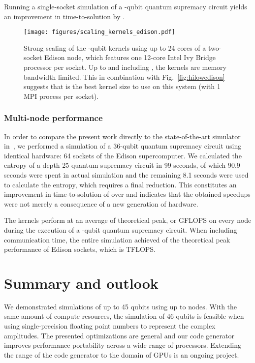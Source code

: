 \documentclass[sigconf]{acmart}
\begin{document}
Running a single-socket simulation of a -qubit quantum supre\-macy circuit yields an improvement in time-to-solution by .

\begin{figure}[t]
	\texttt{[image: figures/scaling\_kernels\_edison.pdf]}
	\caption{Strong scaling of the -qubit kernels using up to 24 cores of a two-socket Edison node, which features one 12-core Intel\textregistered{} Ivy Bridge\texttrademark{} processor per socket. Up to and including , the kernels are memory bandwidth limited. This in combination with Fig.~\ref{fig:hilowedison} suggests that  is the best kernel size to use on this system (with 1 MPI process per socket).}
	\label{fig:strongnodescalingedison}
\end{figure}

\subsubsection{Multi-node performance}

In order to compare the present work directly to the state-of-the-art simulator in~\cite{boixo2016characterizing}, we performed a simulation of a 36-qubit quantum supremacy circuit using identical hardware: 64 sockets of the Edison supercomputer. We calculated the entropy of a depth-25 quantum supremacy circuit in 99 seconds, of which 90.9 seconds were spent in actual simulation and the remaining 8.1 seconds were used to calculate the entropy, which requires a final reduction. This constitutes an improvement in time-to-solution of over  and indicates that the obtained speedups were not merely a consequence of a new generation of hardware.

The kernels perform at an average of  theoretical peak, or  GFLOPS on every node during the execution of a -qubit quantum supremacy circuit. When including communication time, the entire simulation achieved  of the theoretical peak performance of  Edison sockets, which is  TFLOPS.

\section{Summary and outlook}
We demonstrated simulations of up to 45 qubits using up to  nodes. With the same amount of compute resources, the simulation of 46 qubits is feasible when using single-precision floating point numbers to represent the complex amplitudes. The presented optimizations are general and our code generator improves performance portability across a wide range of processors. Extending the range of the code generator to the domain of GPUs is an ongoing project.
\end{document}
